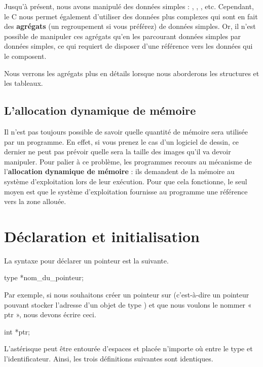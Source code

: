Jusqu'à présent, nous avons manipulé des données simples : ,
, , etc. Cependant, le C nous permet
également d'utiliser des données plus complexes qui sont en fait des
\textbf{agrégats} (un regroupement si vous préférez) de données simples.
Or, il n'est possible de manipuler ces agrégats qu'en les parcourant
données simples par données simples, ce qui requiert de disposer d'une
référence vers les données qui le composent.

\begin{infobox}
Nous verrons les agrégats plus en détails lorsque nous aborderons les
structures et les tableaux.
\end{infobox}


\subsection{L'allocation dynamique de mémoire}
\label{lallocation-dynamique-de-memoire}

Il n'est pas toujours possible de savoir quelle quantité de mémoire sera
utilisée par un programme. En effet, si vous prenez le cas d'un logiciel
de dessin, ce dernier ne peut pas prévoir quelle sera la taille des
images qu'il va devoir manipuler. Pour palier à ce problème, les
programmes recours au mécanisme de l'\textbf{allocation dynamique de
mémoire} : ils demandent de la mémoire au système d'exploitation lors de
leur exécution. Pour que cela fonctionne, le seul moyen est que le
système d'exploitation fournisse au programme une référence vers la zone
allouée.

\section{Déclaration et initialisation}
\label{declaration-et-initialisation-1}

La syntaxe pour déclarer un pointeur est la suivante.

\begin{C}
type *nom_du_pointeur;
\end{C}

Par exemple, si nous souhaitons créer un pointeur sur 
(c'est-à-dire un pointeur pouvant stocker l'adresse d'un objet de type
) et que nous voulons le nommer « ptr », nous devons écrire
ceci.

\begin{C}
int *ptr;
\end{C}

L'astérisque peut être entourée d'espaces et placée n'importe où entre
le type et l'identificateur. Ainsi, les trois définitions suivantes sont
identiques.

